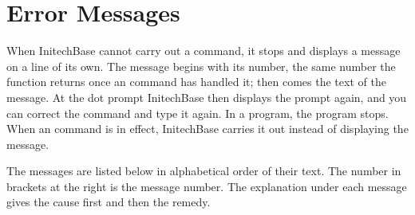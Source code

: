 \chapter{Error Messages}
\NoDictionaryHeads
When InitechBase cannot carry out a command, it stops and displays a message
on a line of its own.  The message begins with its number, the same number the
function  returns once an  command has handled it; then comes
the text of the message.  At the dot prompt InitechBase then displays the
prompt again, and you can correct the command and type it again.  In a program,
the program stops.  When an  command is in effect, InitechBase
carries it out instead of displaying the message.

The messages are listed below in alphabetical order of their text.  The number
in brackets at the right is the message number.  The explanation under each
message gives the cause first and then the remedy.



